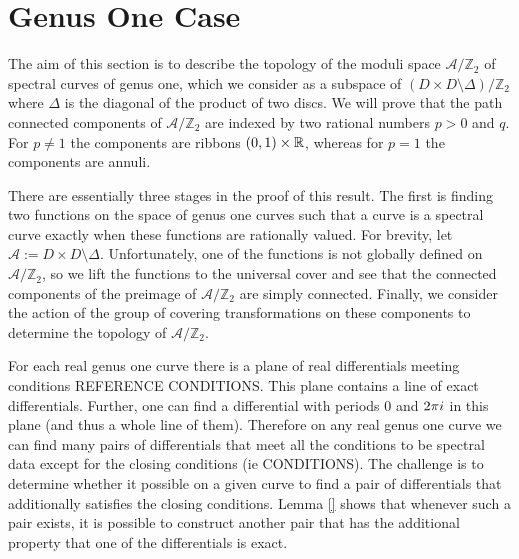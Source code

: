 \documentclass{article}
\begin{document}
\section{Genus One Case}
\label{sec:Genus One Case}

The aim of this section is to describe the topology of the moduli space $\mathcal{A}/\mathbb{Z}_2$ of spectral curves of genus one, which we consider as a subspace of $(D\times D\setminus \Delta)/\mathbb{Z}_2$ where $\Delta$ is the diagonal of the product of two discs. 
We will prove that the path connected components of $\mathcal{A}/\mathbb{Z}_2$ are indexed by two rational numbers $p > 0$ and $q$. For $p\neq 1$ the components are ribbons $(0,1)\times \mathbb{R}$, whereas for $p=1$ the components are annuli.

There are essentially three stages in the proof of this result. The first is finding two functions on the space of genus one curves such that a curve is a spectral curve exactly when these functions are rationally valued. For brevity, let $\mathcal{A} := D\times D\setminus \Delta$. Unfortunately, one of the functions is not globally defined on $\mathcal{A}/\mathbb{Z}_2$, so we lift the functions to the universal cover and see that the connected components of the preimage of $\mathcal{A}/\mathbb{Z}_2$ are simply connected. Finally, we consider the action of the group of covering transformations on these components to determine the topology of $\mathcal{A}/\mathbb{Z}_2$.

For each real genus one curve there is a plane of real differentials meeting conditions REFERENCE CONDITIONS. %
This plane contains a line of exact differentials. 
Further, one can find a differential with periods $0$ and $2\pi i$ in this plane (and thus a whole line of them). 
Therefore on any real genus one curve we can find many pairs of differentials that meet all the conditions to be spectral data except for the closing conditions (ie CONDITIONS). %
The challenge is to determine whether it possible on a given curve to find a pair of differentials that additionally satisfies the closing conditions.
Lemma \ref{} shows that whenever such a pair exists, it is possible to construct another pair that has the additional property that one of the differentials is exact.
\end{document}
